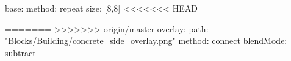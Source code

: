 base:
  method: repeat
  size: [8,8]
<<<<<<< HEAD

=======
>>>>>>> origin/master
overlay:
  path: "Blocks/Building/concrete_side_overlay.png"
  method: connect
  blendMode: subtract
